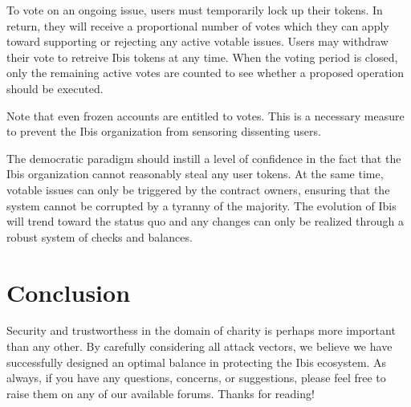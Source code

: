 \documentclass{article}
\begin{document}
To vote on an ongoing issue, users must temporarily lock up their tokens. In
return, they will receive a proportional number of votes which they can apply
toward supporting or rejecting any active votable issues. Users may withdraw
their vote to retreive Ibis tokens at any time. When the voting period is
closed, only the remaining active votes are counted to see whether a proposed
operation should be executed.

Note that even frozen accounts are entitled to votes. This is a necessary
measure to prevent the Ibis organization from sensoring dissenting users.

The democratic paradigm should instill a level of confidence in the fact that
the Ibis organization cannot reasonably steal any user tokens. At the same time,
votable issues can only be triggered by the contract owners, ensuring that the
system cannot be corrupted by a tyranny of the majority. The evolution of Ibis
will trend toward the status quo and any changes can only be realized through a
robust system of checks and balances.

\section{Conclusion}

Security and trustworthess in the domain of charity is perhaps more important
than any other. By carefully considering all attack vectors, we believe we have
successfully designed an optimal balance in protecting the Ibis ecosystem. As
always, if you have any questions, concerns, or suggestions, please feel free to
raise them on any of our available forums. Thanks for reading!
\end{document}
